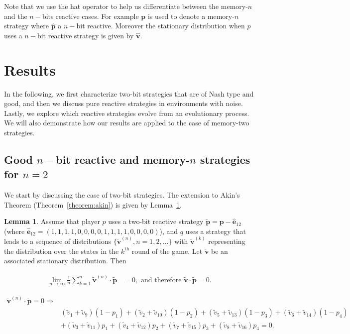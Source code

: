 \documentclass{article}
\theoremstyle{definition}
\newtheorem{lemma}[theorem]{Lemma}
\begin{document}
Note that we use the hat operator to help us differentiate between
the memory-\(n\) and the \(n-\)bits reactive cases. For example \(\mathbf{p}\) is used
to denote a memory-\(n\) strategy where \(\mathbf{\hat{p}}\) a \(n-\)bit reactive.
Moreover the stationary distribution when \(p\) uses a \(n-\)bit reactive
strategy is given by \(\mathbf{\hat{v}}\).

\section{Results}\label{section:results}

In the following, we first characterize two-bit strategies that
are of Nash type and good, and then we discuss pure reactive strategies in
environments with noise. Lastly, we explore which reactive strategies evolve
from an evolutionary process. We will also demonstrate how our results
are applied to the case of memory-two strategies.

\subsection{Good \(n-\)bit reactive and memory-\(n\) strategies for
\(n=2\)}\label{section:good_nash_strategies}

We start by discussing the case of two-bit strategies. The extension to Akin's
Theorem (Theorem~\ref{theorem:akin}) is given by Lemma~\ref{lemma:akin_extended}.

\begin{lemma}\label{lemma:akin_extended}
  Assume that player \(p\) uses a two-bit reactive strategy \(\mathbf{\tilde{p}} = \mathbf{p} - \mathbf{\hat{e}}_{1 2}\)
  (where \(\mathbf{\hat{e}}_{1 2} = (1, 1, 1, 1, \allowbreak 0,
  0, 0, 0, 1, 1, 1, 1, 0, 0, 0, 0)\)), and \(q\) uses a strategy that leads to a sequence
  of distributions \(\{\mathbf{\tilde{v}}^{(n)}, n = 1, 2, ...\}\) with
  \(\mathbf{\tilde{v}}^{(k)}\) representing the distribution over the states in the
  \(k^{\text{th}}\) round of the game. Let \(\mathbf{\tilde{v}}\) be an associated
  stationary distribution. Then

  \begin{align*}
    \lim_{n \rightarrow \infty} \frac{1}{n} \sum_{k=1}^{n} \mathbf{\tilde{v}}^{(n)} \cdot\mathbf{\tilde{p}} & = 0, \text{ and therefore } \mathbf{\tilde{v}} \cdot \mathbf{\tilde{p}} = 0.
  \end{align*}

  \begin{align}\label{eq:akin_extended}
  \mathbf{\tilde{v}}^{(n)} \cdot \mathbf{\tilde{p}} = 0 \Rightarrow & \nonumber \\
  & (\tilde{v}_{1} + \tilde{v}_{9}) (1 - p_1) + (\tilde{v}_{2} + \tilde{v}_{10}) (1 - p_2)  + (\tilde{v}_{5} + \tilde{v}_{13}) (1 - p_3) + (\tilde{v}_{6} + \tilde{v}_{14}) (1 - p_4) \nonumber \\
  & + (\tilde{v}_{3} + \tilde{v}_{11})p_1  + (\tilde{v}_{4} + \tilde{v}_{12})p_2 + (\tilde{v}_{7} + \tilde{v}_{15}) p_3 + (\tilde{v}_{8} + \tilde{v}_{16}) p_4 = 0.
  \end{align}
\end{lemma}
\end{document}
